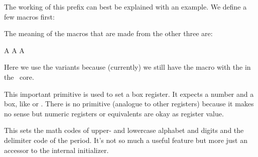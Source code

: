 %
%

\startbuffer
              \def\TestA{A}
\semiprotected{}
    \protected{}

\edef\TestD{\TestA           \TestB           \TestC}
\edef\TestE{\TestA\semiexpand\TestB\semiexpand\TestC}
\edef\TestF{\TestA\expand    \TestB\expand    \TestC}

\edef\TestG{\expanded    {\TestA\TestB\TestC}}
\edef\TestH{\semiexpanded{\TestA\TestB\TestC}}
\stopbuffer

The working of this prefix can best be explained with an example. We define a few
macros first:

\typebuffer \getbuffer

The meaning of the macros that are made from the other three are:

\startbuffer
\meaningless\TestD
\meaningless\TestE
\meaningless\TestF
\meaningless\TestG
\meaningless\TestH
\stopbuffer

Here we use the  variants because (currently) we still have the
macro with the \type {\expanded} in the \CONTEXT\ core.

\startlines \tttf \getbuffer \stoplines

\stopnewprimitive

\startoldprimitive[title={\prm {setbox}}]

This important primitive is used to set a box register. It expects a number and a
box, like  or . There is no \type {\boxdef} primitive
(analogue to other registers) because it makes no sense but numeric registers or
equivalents are okay as register value.

\stopoldprimitive

\startnewprimitive[title={\prm {setdefaultmathcodes}}]

This sets the math codes of upper- and lowercase alphabet and digits and the
delimiter code of the period. It's not so much a useful feature but more just an
accessor to the internal initializer.

\stopnewprimitive

\startnewprimitive[title={\prm {setfontid}}]

